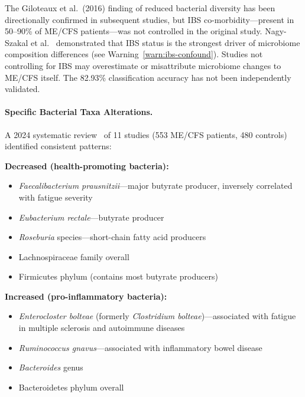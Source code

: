 \begin{warning}
The Giloteaux et al.\ (2016) finding of reduced bacterial diversity has been directionally confirmed in subsequent studies, but IBS co-morbidity---present in 50--90\% of ME/CFS patients---was not controlled in the original study. Nagy-Szakal et al.~\cite{NagySzakal2017} demonstrated that IBS status is the strongest driver of microbiome composition differences (see Warning~\ref{warn:ibs-confound}). Studies not controlling for IBS may overestimate or misattribute microbiome changes to ME/CFS itself. The 82.93\% classification accuracy has not been independently validated.
\end{warning}

\paragraph{Specific Bacterial Taxa Alterations.}

A 2024 systematic review~\cite{MicrobiomeSystematicReview2024} of 11 studies (553 ME/CFS patients, 480 controls) identified consistent patterns:

\textbf{Decreased (health-promoting bacteria):}
\begin{itemize}
    \item \textit{Faecalibacterium prausnitzii}---major butyrate producer, inversely correlated with fatigue severity
    \item \textit{Eubacterium rectale}---butyrate producer
    \item \textit{Roseburia} species---short-chain fatty acid producers
    \item Lachnospiraceae family overall
    \item Firmicutes phylum (contains most butyrate producers)
\end{itemize}

\textbf{Increased (pro-inflammatory bacteria):}
\begin{itemize}
    \item \textit{Enterocloster bolteae} (formerly \textit{Clostridium bolteae})---associated with fatigue in multiple sclerosis and autoimmune diseases
    \item \textit{Ruminococcus gnavus}---associated with inflammatory bowel disease
    \item \textit{Bacteroides} genus
    \item Bacteroidetes phylum overall
\end{itemize}


